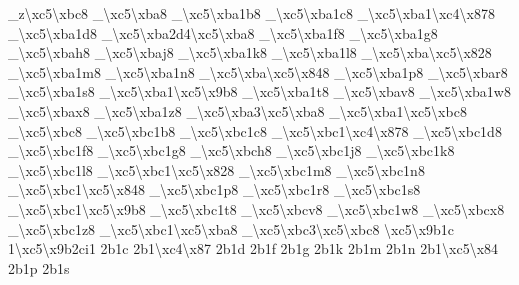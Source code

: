 {\-\_\-z\textbackslash{}xc5\textbackslash{}xbc8 \-\_\-\textbackslash{}xc5\textbackslash{}xba8 \-\_\textbackslash{}xc5\textbackslash{}xba1b8 \-\_\textbackslash{}xc5\textbackslash{}xba1c8 \-\_\textbackslash{}xc5\textbackslash{}xba1\textbackslash{}xc4\textbackslash{}x878 \-\_\textbackslash{}xc5\textbackslash{}xba1d8 \-\_\-\textbackslash{}xc5\textbackslash{}xba2d4\textbackslash{}xc5\textbackslash{}xba8 \-\_\textbackslash{}xc5\textbackslash{}xba1f8 \-\_\textbackslash{}xc5\textbackslash{}xba1g8 \-\_\-\textbackslash{}xc5\textbackslash{}xbah8 \-\_\-\textbackslash{}xc5\textbackslash{}xbaj8 \-\_\textbackslash{}xc5\textbackslash{}xba1k8 \-\_\textbackslash{}xc5\textbackslash{}xba1l8 \-\_\-\textbackslash{}xc5\textbackslash{}xba\textbackslash{}xc5\textbackslash{}x828 \-\_\textbackslash{}xc5\textbackslash{}xba1m8 \-\_\textbackslash{}xc5\textbackslash{}xba1n8 \-\_\-\textbackslash{}xc5\textbackslash{}xba\textbackslash{}xc5\textbackslash{}x848 \-\_\textbackslash{}xc5\textbackslash{}xba1p8 \-\_\-\textbackslash{}xc5\textbackslash{}xbar8 \-\_\textbackslash{}xc5\textbackslash{}xba1s8 \-\_\textbackslash{}xc5\textbackslash{}xba1\textbackslash{}xc5\textbackslash{}x9b8 \-\_\textbackslash{}xc5\textbackslash{}xba1t8 \-\_\-\textbackslash{}xc5\textbackslash{}xbav8 \-\_\textbackslash{}xc5\textbackslash{}xba1w8 \-\_\-\textbackslash{}xc5\textbackslash{}xbax8 \-\_\textbackslash{}xc5\textbackslash{}xba1z8 \-\_\textbackslash{}xc5\textbackslash{}xba3\textbackslash{}xc5\textbackslash{}xba8 \-\_\textbackslash{}xc5\textbackslash{}xba1\textbackslash{}xc5\textbackslash{}xbc8 \-\_\-\textbackslash{}xc5\textbackslash{}xbc8 \-\_\textbackslash{}xc5\textbackslash{}xbc1b8 \-\_\textbackslash{}xc5\textbackslash{}xbc1c8 \-\_\textbackslash{}xc5\textbackslash{}xbc1\textbackslash{}xc4\textbackslash{}x878 \-\_\textbackslash{}xc5\textbackslash{}xbc1d8 \-\_\textbackslash{}xc5\textbackslash{}xbc1f8 \-\_\textbackslash{}xc5\textbackslash{}xbc1g8 \-\_\-\textbackslash{}xc5\textbackslash{}xbch8 \-\_\textbackslash{}xc5\textbackslash{}xbc1j8 \-\_\textbackslash{}xc5\textbackslash{}xbc1k8 \-\_\textbackslash{}xc5\textbackslash{}xbc1l8 \-\_\textbackslash{}xc5\textbackslash{}xbc1\textbackslash{}xc5\textbackslash{}x828 \-\_\textbackslash{}xc5\textbackslash{}xbc1m8 \-\_\textbackslash{}xc5\textbackslash{}xbc1n8 \-\_\textbackslash{}xc5\textbackslash{}xbc1\textbackslash{}xc5\textbackslash{}x848 \-\_\textbackslash{}xc5\textbackslash{}xbc1p8 \-\_\textbackslash{}xc5\textbackslash{}xbc1r8 \-\_\textbackslash{}xc5\textbackslash{}xbc1s8 \-\_\textbackslash{}xc5\textbackslash{}xbc1\textbackslash{}xc5\textbackslash{}x9b8 \-\_\textbackslash{}xc5\textbackslash{}xbc1t8 \-\_\-\textbackslash{}xc5\textbackslash{}xbcv8 \-\_\textbackslash{}xc5\textbackslash{}xbc1w8 \-\_\-\textbackslash{}xc5\textbackslash{}xbcx8 \-\_\textbackslash{}xc5\textbackslash{}xbc1z8 \-\_\textbackslash{}xc5\textbackslash{}xbc1\textbackslash{}xc5\textbackslash{}xba8 \-\_\textbackslash{}xc5\textbackslash{}xbc3\textbackslash{}xc5\textbackslash{}xbc8 \textbackslash{}xc5\textbackslash{}x9b1c 1\textbackslash{}xc5\textbackslash{}x9b2ci1 2b1c 2b1\textbackslash{}xc4\textbackslash{}x87 2b1d 2b1f 2b1g 2b1k 2b1m 2b1n 2b1\textbackslash{}xc5\textbackslash{}x84 2b1p 2b1s }
